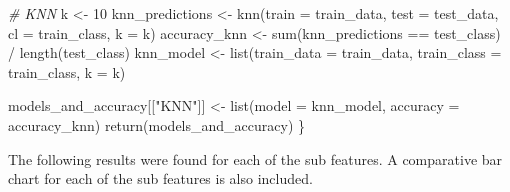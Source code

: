\documentclass[
]{article}
\newenvironment{Shaded}{\begin{snugshade}}{\end{snugshade}}
\newcommand{\AttributeTok}[1]{\textcolor[rgb]{0.77,0.63,0.00}{#1}}
\newcommand{\CommentTok}[1]{\textcolor[rgb]{0.56,0.35,0.01}{\textit{#1}}}
\newcommand{\DecValTok}[1]{\textcolor[rgb]{0.00,0.00,0.81}{#1}}
\newcommand{\FunctionTok}[1]{\textcolor[rgb]{0.00,0.00,0.00}{#1}}
\newcommand{\NormalTok}[1]{#1}
\newcommand{\OtherTok}[1]{\textcolor[rgb]{0.56,0.35,0.01}{#1}}
\newcommand{\SpecialCharTok}[1]{\textcolor[rgb]{0.00,0.00,0.00}{#1}}
\newcommand{\StringTok}[1]{\textcolor[rgb]{0.31,0.60,0.02}{#1}}
\begin{document}
\begin{Shaded}
\begin{Highlighting}[]
  \CommentTok{\# KNN}
\NormalTok{  k }\OtherTok{\textless{}{-}} \DecValTok{10}
\NormalTok{  knn\_predictions }\OtherTok{\textless{}{-}} \FunctionTok{knn}\NormalTok{(}\AttributeTok{train =}\NormalTok{ train\_data, }\AttributeTok{test =}\NormalTok{ test\_data, }\AttributeTok{cl =}\NormalTok{ train\_class, }\AttributeTok{k =}\NormalTok{ k)}
\NormalTok{  accuracy\_knn }\OtherTok{\textless{}{-}} \FunctionTok{sum}\NormalTok{(knn\_predictions }\SpecialCharTok{==}\NormalTok{ test\_class) }\SpecialCharTok{/} \FunctionTok{length}\NormalTok{(test\_class)}
\NormalTok{  knn\_model }\OtherTok{\textless{}{-}} \FunctionTok{list}\NormalTok{(}\AttributeTok{train\_data =}\NormalTok{ train\_data, }\AttributeTok{train\_class =}\NormalTok{ train\_class, }\AttributeTok{k =}\NormalTok{ k)}

\NormalTok{  models\_and\_accuracy[[}\StringTok{"KNN"}\NormalTok{]] }\OtherTok{\textless{}{-}} \FunctionTok{list}\NormalTok{(}\AttributeTok{model =}\NormalTok{ knn\_model, }\AttributeTok{accuracy =}\NormalTok{ accuracy\_knn)}
  \FunctionTok{return}\NormalTok{(models\_and\_accuracy)}
\NormalTok{\}}
\end{Highlighting}
\end{Shaded}

\newpage

The following results were found for each of the sub features. A comparative bar chart for each of the sub features is also included.
\end{document}
